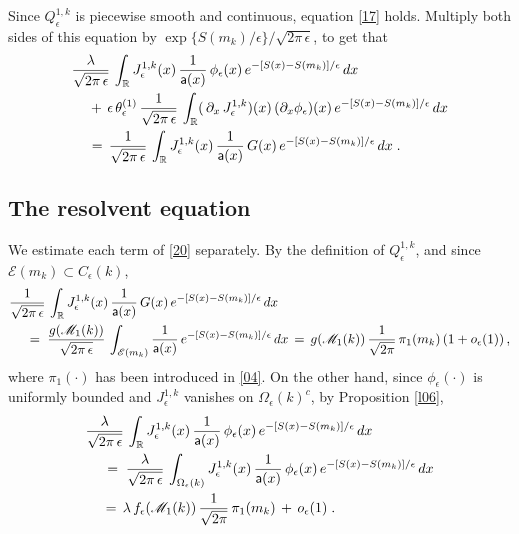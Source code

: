 \documentclass[reqno]{amsart}
\theoremstyle{plain}
\theoremstyle{definition}
\newcommand{\bb}[1]{{\mathbb #1}}
\newcommand{\ms}[1]{{\mathscr #1}}
\newcommand{\mss}[1]{{\textsf #1}}
\newcounter{as}[section]
\newcommand{\<}{\langle}
\renewcommand{\>}{\rangle}
\begin{document}
Since $Q_{\epsilon}^{1,k}$ is piecewise smooth and continuous,
equation \eqref{17} holds. Multiply both sides of this equation
by $\exp\{S(m_k) /\epsilon\}/\sqrt{2\pi\, \epsilon}$, 
to get that
\begin{equation}
\label{20}
\begin{aligned}
& \frac{\lambda}{\sqrt{2\pi\, \epsilon}}\, \int_{\bb R} J_{\epsilon}^{1,k} (x)\,
\frac{1}{\mss a(x)} \, \phi_{\epsilon} (x) \, e^{-[S(x) - S(m_k)] /\epsilon} \, dx
\\
&\quad 
\,+\, \epsilon \, \theta^{(1)}_{\epsilon}\,
\frac{1}{\sqrt{2\pi\, \epsilon}}\, \int_{\bb R} (\, \partial_x \,
J_{\epsilon}^{1,k} )(x) \, (\partial_x \phi_{\epsilon}) (x) \,
e^{-[S(x)-S(m_k)]/\epsilon} \, dx
\\
& \quad \,=\, \frac{1}{\sqrt{2\pi\, \epsilon}}\,
\int_{\bb R} J_{\epsilon}^{1,k}(x)\, \frac{1}{\mss a(x)} \,  G(x) \,
e^{-[S(x)-S(m_k)] /\epsilon} \, dx\;.
\end{aligned}
\end{equation}

\subsection*{The resolvent equation}

We estimate each term of \eqref{20} separately.  By the definition of
$Q^{1,k}_{\epsilon}$, and since $\ms E(m_k) \subset C_\epsilon(k)$,
\begin{equation}
\label{32}
\begin{aligned}
& \frac{1}{\sqrt{2\pi\, \epsilon}}\, \int_{\bb R}
J_{\epsilon}^{1,k}(x)\, \frac{1}{\mss a(x)} \,  G(x) \,
e^{-[S(x)-S(m_k)] /\epsilon} \, dx
\\
&\quad \;=\; \frac{g(\ms M_1(k))}{\sqrt{2\pi\, \epsilon}}\, \int_{\ms E(m_k)}
\frac{1}{\mss a(x)} \,  
e^{-[S(x)-S(m_k)] /\epsilon} \, dx \,=\,  g(\ms M_1(k))
\, \frac{1}{\sqrt{2\pi}}\, \pi_1(m_k)
\, (1+ o_\epsilon(1)) \,,
\end{aligned}
\end{equation}
where $\pi_1(\cdot)$ has been introduced in \eqref{04}.  On the other
hand, since $\phi_{\epsilon}(\cdot)$ is uniformly bounded and
$J_{\epsilon}^{1,k}$ vanishes on $\Omega_\epsilon (k)^c$, by
Proposition \ref{l06},
\begin{equation}
\label{22b}
\begin{aligned}
& \frac{\lambda}{\sqrt{2\pi\, \epsilon}}\, \int_{\bb R} J_{\epsilon}^{1,k} (x)\,
\frac{1}{\mss a(x)} \, \phi_{\epsilon} (x) \, e^{-[S(x) - S(m_k)] /\epsilon} \, dx
\\
&\quad \;=\;
\frac{\lambda}{\sqrt{2\pi\, \epsilon}}\, \int_{\Omega_\epsilon (k)}  J_{\epsilon}^{1,k} (x)\,
\frac{1}{\mss a(x)} \, \phi_{\epsilon} (x) \, e^{-[S(x) - S(m_k)]
/\epsilon} \, dx
\\ & \quad 
\,=\, \lambda\, f_{\epsilon}(\ms M_1(k))\, \frac{1}{\sqrt{2\pi}}\,
\pi_1(m_k) \, + \, o_\epsilon(1) \;.
\end{aligned}
\end{equation}
\end{document}
